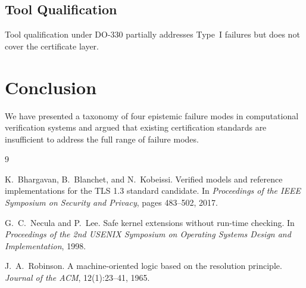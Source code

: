\documentclass[twocolumn,12pt]{article}
\begin{document}
\lipsum[12]

\subsection{Tool Qualification}

Tool qualification under DO-330 partially addresses Type~I failures but
does not cover the certificate layer.
\lipsum[13]

\section{Conclusion}
\label{sec:conclusion}

We have presented a taxonomy of four epistemic failure modes in computational
verification systems and argued that existing certification standards are
insufficient to address the full range of failure modes.
\lipsum[14]

\begin{thebibliography}{9}

K.~Bhargavan, B.~Blanchet, and N.~Kobeissi.
\newblock Verified models and reference implementations for the {TLS} 1.3
  standard candidate.
\newblock In \emph{Proceedings of the IEEE Symposium on Security and Privacy},
  pages 483--502, 2017.

G.~C.~Necula and P.~Lee.
\newblock Safe kernel extensions without run-time checking.
\newblock In \emph{Proceedings of the 2nd USENIX Symposium on Operating Systems
  Design and Implementation}, 1998.

J.~A.~Robinson.
\newblock A machine-oriented logic based on the resolution principle.
\newblock \emph{Journal of the ACM}, 12(1):23--41, 1965.

\end{thebibliography}
\end{document}
